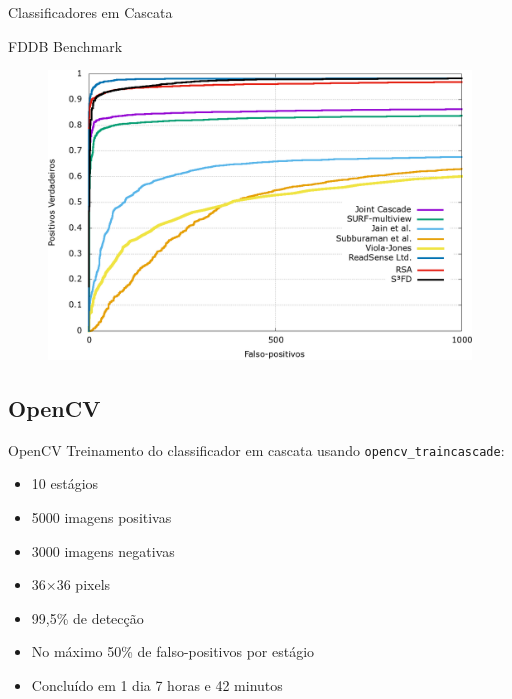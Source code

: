 \begin{frame}{Classificadores em Cascata}
\begin{center}
\end{center}
\end{frame}

\begin{frame}{FDDB Benchmark}
\begin{figure}
    \centering
    \includegraphics[height=0.82\textheight,width=\textwidth,keepaspectratio]{imagens/FDDB_deteccao_compara.png}
\end{figure}
\end{frame}


\subsection{OpenCV}

\begin{frame}{OpenCV}
Treinamento do classificador em cascata usando \texttt{opencv\_traincascade}:

\begin{itemize}
    \item 10 estágios
    \item 5000 imagens positivas
    \item 3000 imagens negativas
    \item 36$\times$36 pixels
    \item 99,5\% de detecção
    \item No máximo 50\% de falso-positivos por estágio
    \item Concluído em 1 dia 7 horas e 42 minutos
\end{itemize}

\end{frame}


